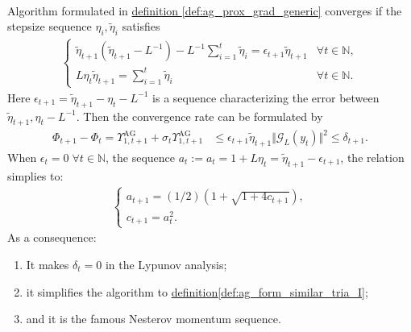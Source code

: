     \begin{theorem}
        \label{thm:ag_generic_stepsize_constrants}
        \;\\
        Algorithm formulated in 
        \hyperref[def:ag_prox_grad_generic]{definition \ref*{def:ag_prox_grad_generic}}
        converges if the stepsize sequence $\eta_i, \tilde \eta_{i}$ satisfies
        \begin{align*}
            \begin{cases}
                \tilde \eta_{t + 1} (\tilde \eta_{t + 1} - L^{-1})
                - L^{-1} \sum_{i= 1}^{t}\tilde \eta_i 
                = 
                \epsilon_{t + 1} \tilde \eta_{t + 1}
                & \forall t \in \mathbb N, 
                \\
                L \eta_t \tilde \eta_{t + 1} = \sum_{i=1}^{t}\tilde \eta_i 
                & \forall t \in \mathbb N. 
            \end{cases}
        \end{align*}
        Here $\epsilon_{t + 1} = \tilde \eta_{t + 1} - \eta_t - L^{-1}$ is a sequence characterizing the error between $\tilde \eta_{t + 1}, \eta_t - L^{-1}$. 
        Then the convergence rate can be formulated by
        \begin{align*}
            \Phi_{t + 1} - \Phi_t =
            \Upsilon_{1, t + 1}^\text{AG} + 
            \sigma_t\Upsilon_{1, t + 1}^{\text{AG}} 
            &\le \epsilon_{t + 1}\tilde\eta_{t + 1} \Vert \mathcal G_L(y_t)\Vert^2 \le \delta_{t + 1}.
        \end{align*}
        When $\epsilon_t = 0 \;\forall t\in \mathbb N$, the sequence $a_t:= a_t = 1 + L \eta_t = \tilde \eta_{t + 1} - \epsilon_{t + 1}$, the relation simplies to: 
        \begin{align*}
            \begin{cases}
                a_{t + 1} = (1/2)\left(
                1 + \sqrt{1 + 4 c_{t + 1}}
                \right), 
                \\
                c_{t + 1} = a_t^2.     
            \end{cases}
        \end{align*}
        As a consequence: 
        \begin{enumerate}
            \item It makes $\delta_{t} = 0$ in the Lypunov analysis; 
            \item it simplifies the algorithm to
            \hyperref[def:ag_form_similar_tria_I]{definition\ref*{def:ag_form_similar_tria_I}}; 
            \item and it is the famous Nesterov momentum sequence. 
        \end{enumerate}
        
        
    \end{theorem}
